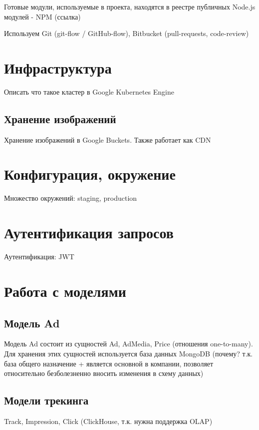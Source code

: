 \documentclass[times]{itmo-student-thesis}
\begin{document}
Готовые модули, используемые в проекта, находятся в реестре публичных Node.js модулей - NPM (ссылка)

Используем Git (git-flow / GitHub-flow), Bitbucket (pull-requests, code-review)

\section{Инфраструктура}

Описать что такое кластер в Google Kubernetes Engine

\subsection{Хранение изображений}
Хранение изображений в Google Buckets. Также работает как CDN

\section{Конфигурация, окружение}

Множество окружений: staging, production \cite{twelve-factor-app}


\section{Аутентификация запросов}

Аутентификация: JWT


\section{Работа с моделями}

\subsection{Модель Ad}

Модель Ad состоит из сущностей Ad, AdMedia, Price (отношения one-to-many). Для хранения этих сущностей используется база данных MongoDB \cite{mongodb} (почему? т.к. база общего назначение + является основной в компании, позволяет относительно безболезненно вносить изменения в схему данных)

\subsection{Модели трекинга}

Track, Impression, Click (ClickHouse, т.к. нужна поддержка OLAP)
\end{document}

